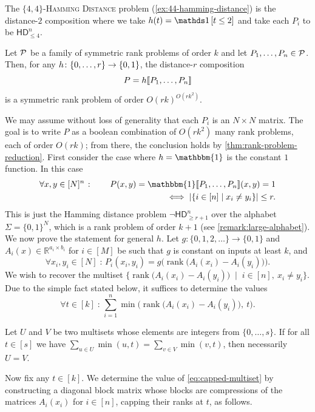 \documentclass[conference]{IEEEtran}
\DeclareMathOperator{\rank}{rank}
\newcommand{\HD}[1]{\mathsf{HD}_{#1}}
\newcommand{\R}{\mathbb{R}}
\begin{document}
\begin{example}
    The \textsc{$\{4,4\}$-Hamming Distance} problem (\cref{ex:44-hamming-distance})
    is the distance-$2$ composition where we take $h(t) = \ind{t \leq 2}$
    and take each $P_i$ to be $\HD{\leq 4}^n$.
\end{example}

\begin{lemma}
\label{thm:rank-problem-composition}
Let $\mathcal{P}$ be a family of symmetric rank problems of order $k$ and let $P_1, \dotsc, P_n \in \mathcal{P}$. Then, for any $h \colon \{0, \dotsc, r\} \to \{0,1\}$, the distance-$r$ composition
\[
	P = h[\![ P_1, \dotsc, P_n ]\!]
\]
is a symmetric rank problem of order $O(rk)^{O(rk^2)}$.
\end{lemma}

\begin{IEEEproof}
We may assume without loss of generality that each $P_i$ is an $N \times N$
matrix. The goal is to write $P$ as a boolean combination of $O(rk^2)$ many rank
problems, each of order $O(rk)$; from there, the conclusion holds by
\cref{thm:rank-problem-reduction}. First consider the case where $h =
\mathbbm{1}$ is the constant $1$ function. In this case
\begin{align*}
  \forall x,y\in[N]^n \;\colon\qquad
    P(x,y) = \mathbbm{1} \ldsbracket P_1, \dotsc, P_n \rdsbracket (x,y) = 1\\
    \iff |\{i\in [n] \mid x_i\neq y_i\}| \leq r.
\end{align*}
This is just the Hamming distance problem $\neg \HD{\geq r+1}^n$ over the  alphabet
$\Sigma = \{0,1\}^N$, which is a rank problem of order $k+1$ (see
\cref{remark:large-alphabet}). We now prove the statement for general $h$. Let $g \colon
\{0,1,2,\dotsc\}\to \{0,1\}$ and $A_i(x) \in\R^{a_i\times b_i}$ for $i\in [M]$
be such that $g$ is constant on inputs at least $k$, and
\[
	\forall x_i, y_i \in[N] \;\colon\, P_i(x_i, y_i) = g\Big(\rank\!\big(A_i(x_i)-A_i(y_i)\big)\Big).
\]
We wish to recover the multiset $\big\{ \rank\!\big(A_i(x_i) - A_i(y_i)\big) \;\mid\; i \in [n],\ 
	x_i \neq y_i \big\}$.
Due to the simple fact stated below, it suffices to determine the values
\begin{equation}
\label{eq:capped-multiset}
    \forall t \in [k] \;\colon\, \sum_{i=1}^n \min\Big( \rank\!\big(A_i(x_i) - A_i(y_i)\big),\ t \Big).
\end{equation}

\begin{fact}\label{fact:multiset}
Let $U$ and $V$ be two multisets whose elements are integers from $\{0, \dotsc, s\}$. If for all $t \in [s]$ we have $\sum_{u \in U} \min(u, t) = \sum_{v \in V} \min(v, t)$, then necessarily $U = V$.
\end{fact}
Now fix any $t \in [k]$. We determine the value of \cref{eq:capped-multiset} by constructing a diagonal block matrix whose blocks are compressions of the matrices $A_i(x_i)$ for $i\in [n]$, capping their ranks at $t$, as follows. 


\end{IEEEproof}
\end{document}
